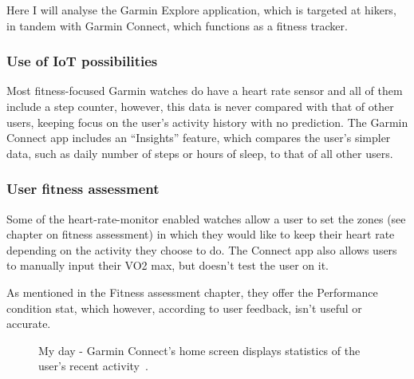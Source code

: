 Here I will analyse the Garmin Explore application, which is targeted at hikers, in tandem with Garmin Connect, which functions as a fitness tracker.

\subsubsection*{Use of IoT possibilities}
Most fitness-focused Garmin watches do have a heart rate sensor and all of them include a step counter, however, this data is never compared with that of other users, keeping focus on the user's activity history with no prediction.
The Garmin Connect app includes an ``Insights'' feature, which compares the user's simpler data, such as daily number of steps or hours of sleep, to that of all other users.
\subsubsection*{User fitness assessment}
Some of the heart-rate-monitor enabled watches allow a user to set the zones (see chapter on fitness assessment) in which they would like to keep their heart rate depending on the activity they choose to do.
The Connect app also allows users to manually input their VO2 max, but doesn't test the user on it.

As mentioned in the Fitness assessment chapter, they offer the Performance condition stat, which however, according to user feedback, isn't useful or accurate.

\begin{figure}[h]
    \centering
        \caption{My day - Garmin Connect's home screen displays statistics of the user's recent activity~\cite{garmin-my-day-img}.}
        \label{garmin-my-day-img}
\end{figure}

